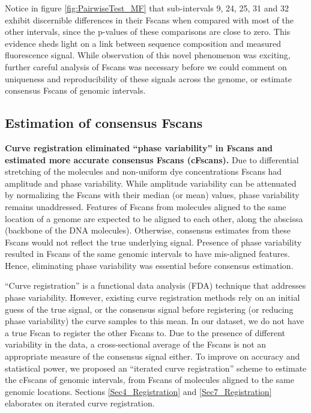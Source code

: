 Notice in figure \ref{fig:PairwiseTest_MF} that sub-intervals 9, 24, 25, 31 and 32 exhibit discernible differences in their Fscans when compared with most of the other intervals, since the p-values of these comparisons are close to zero. This evidence sheds light on a link between sequence composition and measured fluorescence signal. While observation of this novel phenomenon was exciting, further careful analysis of Fscans was necessary before we could comment on uniqueness and reproducibility of these signals across the genome, or estimate consensus Fscans of genomic intervals. \\

\subsection{Estimation of consensus Fscans}
{\bf{Curve registration eliminated ``phase variability'' in Fscans and estimated more accurate consensus Fscans (cFscans).}} Due to differential stretching of the molecules and non-uniform dye concentrations Fscans had amplitude and phase variability. While amplitude variability can be attenuated by normalizing the Fscans with their median (or mean) values, phase variability remains unaddressed. Features of Fscans from molecules aligned to the same location of a genome are expected to be aligned to each other, along the abscissa (backbone of the DNA molecules). Otherwise, consensus estimates from these Fscans would not reflect the true underlying signal. Presence of phase variability resulted in Fscans of the same genomic intervals to have mis-aligned features. Hence, eliminating phase variability was essential before consensus estimation. 

``Curve registration'' is a functional data analysis (FDA) technique that addresses phase variability. However, existing curve registration methods rely on an initial guess of the true signal, or the consensus signal before registering (or reducing phase variability) the curve samples to this mean. In our dataset, we do not have a true Fscan to register the other Fscans to. Due to the presence of different variability in the data, a cross-sectional average of the Fscans is not an appropriate measure of the consensus signal either. To improve on accuracy and statistical power, we proposed an ``iterated curve registration'' scheme to estimate the cFscans of genomic intervals, from Fscans of molecules aligned to the same genomic locations. Sections \ref{Sec4_Registration} and \ref{Sec7_Registration} elaborates on iterated curve registration. 

